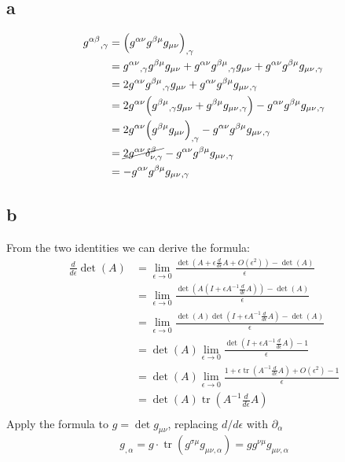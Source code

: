 \documentclass{article}
\DeclareMathOperator{\tr}{tr}
\begin{document}
\subsection*{a}
\begin{align*}
g^{\alpha\beta}{}_{,\gamma} &=\Big( g^{\alpha\nu}g^{\beta\mu}g_{\mu\nu}\Big)_{,\gamma} \\
&= g^{\alpha\nu}{}_{,\gamma}g^{\beta\mu}g_{\mu\nu} + g^{\alpha\nu}g^{\beta\mu}{}_{,\gamma}g_{\mu\nu} + g^{\alpha\nu}g^{\beta\mu}g_{\mu\nu}{}_{,\gamma} \\
&= 2g^{\alpha\nu}g^{\beta\mu}{}_{,\gamma}g_{\mu\nu} + g^{\alpha\nu}g^{\beta\mu}g_{\mu\nu}{}_{,\gamma} \\
&= 2g^{\alpha\nu}\Big( g^{\beta\mu}{}_{,\gamma}g_{\mu\nu} + g^{\beta\mu}g_{\mu\nu}{}_{,\gamma}\Big) - g^{\alpha\nu}g^{\beta\mu}g_{\mu\nu}{}_{,\gamma} \\
&= 2g^{\alpha\nu}\Big(g^{\beta\mu}g_{\mu\nu}\Big)_{,\gamma} - g^{\alpha\nu}g^{\beta\mu}g_{\mu\nu}{}_{,\gamma} \\
&= \cancel{2g^{\alpha\nu}\delta^\beta_{\nu,\gamma}} - g^{\alpha\nu}g^{\beta\mu}g_{\mu\nu}{}_{,\gamma} \\
&= - g^{\alpha\nu}g^{\beta\mu}g_{\mu\nu}{}_{,\gamma} 
\end{align*}
\subsection*{b}
From the two identities we can derive the formula:
\begin{align*} \frac{d}{d\epsilon}\det(A) &=  \lim_{\epsilon \rightarrow 0} \frac{\det(A + \epsilon \frac{d}{d\epsilon}A + O(\epsilon^2)) - \det(A)}{\epsilon}\\
	&= \lim_{\epsilon \rightarrow 0} \frac{\det(A(I + \epsilon A^{-1}\frac{d}{d\epsilon}A)) - \det(A)}{\epsilon} \\
	&=  \lim_{\epsilon \rightarrow 0} \frac{\det(A)\det(I + \epsilon A^{-1}\frac{d}{d\epsilon}A) - \det(A)}{\epsilon} \\
	&=  \det(A) \lim_{\epsilon \rightarrow 0} \frac{\det(I + \epsilon A^{-1}\frac{d}{d\epsilon}A) - 1}{\epsilon} \\
	&=  \det(A) \lim_{\epsilon \rightarrow 0} \frac{1 + \epsilon \tr(A^{-1}\frac{d}{d\epsilon}A) + O(\epsilon^2) - 1}{\epsilon} \\
	&=  \det(A) \tr(A^{-1}\frac{d}{d\epsilon}A) \\
\end{align*}
Apply the formula to $g = \det g_{\mu\nu}$, replacing $d/d\epsilon$ with $\partial_\alpha$
\[ g_{,\alpha} = g \cdot \tr(g^{\sigma\mu}g_{\mu\nu,\alpha}) = g g^{\nu\mu}g_{\mu\nu,\alpha} \]
\end{document}
